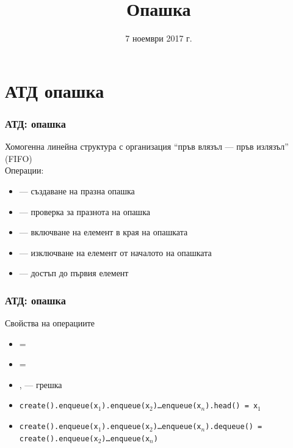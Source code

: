 \documentclass{beamer}
\title{Опашка}
\date{7 ноември 2017 г.}
\begin{document}
\begin{frame}
  \titlepage
\end{frame}

\section{АТД опашка}

\begin{frame}
  \frametitle{АТД: опашка}

  Хомогенна линейна структура с организация ``пръв влязъл --- пръв излязъл'' (FIFO)\\[1em]
  Операции:\\[0.5em]
  \begin{itemize}
  \item {} --- създаване на празна опашка
  \item {} --- проверка за празнота на опашка
  \item {} --- включване на елемент в края на опашката
  \item {} --- изключване на елемент от началото на опашката
  \item {} --- достъп до първия елемент
  \end{itemize}
\end{frame}

\begin{frame}
  \frametitle{АТД: опашка}

  Свойства на операциите\\[0.5em]
  \small
  \begin{itemize}
  \item {} = 
  \item {} = 
  \item {},  --- \alert{грешка}
  \item \tt{create().enqueue(x$_1$).enqueue(x$_2$)\ldots{}enqueue(x$_n$).head() = x$_1$}
  \item \tt{create().enqueue(x$_1$).enqueue(x$_2$)\ldots{}enqueue(x$_n$).dequeue() = create().enqueue(x$_2$)\ldots{}enqueue(x$_n$)}
  \end{itemize}
\end{frame}
\end{document}
